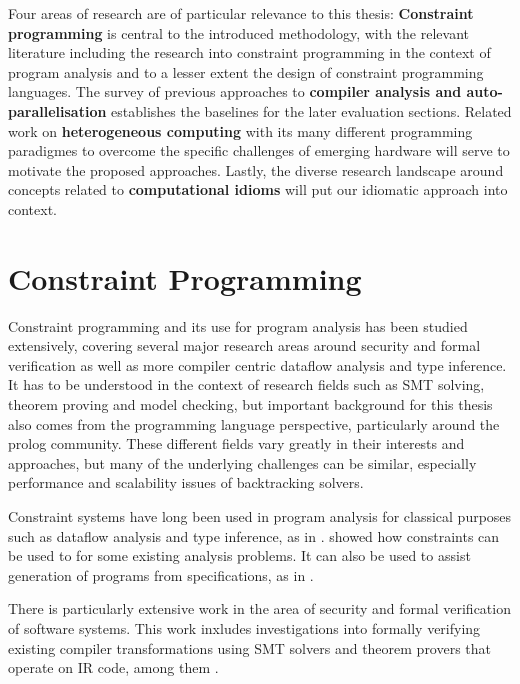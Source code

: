 
    Four areas of research are of particular relevance to this thesis:
    {\bf Constraint programming} is central to the introduced methodology, with
    the relevant literature including the research into constraint programming
    in the context of program analysis and to a lesser extent the design of
    constraint programming languages.
    The survey of previous approaches to
    {\bf compiler analysis and auto-parallelisation}
    establishes the baselines for the later evaluation sections.
    Related work on {\bf heterogeneous computing} with its many different
    programming paradigmes to overcome the specific challenges of emerging
    hardware will serve to motivate the proposed approaches.
    Lastly, the diverse research landscape around concepts related to
    {\bf computational idioms} will put our idiomatic approach into context.

\section{Constraint Programming}

    Constraint programming and its use for program analysis has been studied
    extensively, covering several major research areas around security and
    formal verification as well as more compiler centric dataflow analysis and
    type inference.
    It has to be understood in the context of research fields such as SMT
    solving, theorem proving and model checking, but important background for
    this thesis also comes from the programming language perspective,
    particularly around the prolog community.
    These different fields vary greatly in their interests and approaches, but
    many of the underlying challenges can be similar, especially performance and
    scalability issues of backtracking solvers.

    Constraint systems have long been used in program analysis for classical
    purposes such as dataflow analysis and type inference, as in
    \citet{Aiken:1999:ISC:339853.339897}.
    \citet{Gulwani:2008:PAC:1375581.1375616} showed how constraints can be
    used to for some  existing analysis problems.
    It can also be used to assist generation of programs from specifications,
    as in \citet{Srivastava:2010:PVP:1707801.1706337}.

    There is particularly extensive work in the area of security and formal
    verification of software systems.
    This work inxludes investigations into formally verifying existing compiler
    transformations using SMT solvers and theorem provers that operate on IR
    code, among them \citet{Zhao:2012:FLI:2103656.2103709}.

